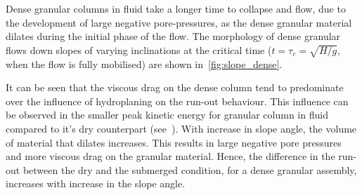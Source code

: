Dense granular columns in fluid take a longer time to collapse and flow, due to the development of large negative pore-pressures, as the dense granular material dilates during the initial phase of the flow. The morphology of dense granular flows down slopes of varying inclinations at the critical time ($t=\tau_{c}=\sqrt{H/g}$, when the flow is fully mobilised) are shown in~\cref{fig:slope_dense}.

It can be seen that the viscous drag on the dense column tend to predominate over the influence of hydroplaning on the run-out behaviour. This influence can be observed in the smaller peak kinetic energy for granular column in fluid compared to it's dry counterpart (see~). With increase in slope angle, the volume of material that dilates increases. This results in large negative pore pressures and more viscous drag on the granular material. Hence, the difference in the run-out between the dry and the submerged condition, for a dense granular assembly, increases with increase in the slope angle.


